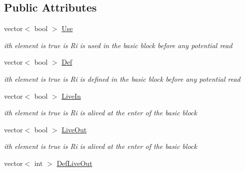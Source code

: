 \subsection*{Public Attributes}
\begin{DoxyCompactItemize}
\item 
\mbox{\label{class_basic__block_ab7802e6562cdb846d793a5a834b4678f}} 
vector$<$ bool $>$ \mbox{\hyperlink{class_basic__block_ab7802e6562cdb846d793a5a834b4678f}{Use}}
\begin{DoxyCompactList}\small\item\em ith element is true is Ri is used in the basic block before any potential read \end{DoxyCompactList}\item 
\mbox{\label{class_basic__block_a061288c8556fe1e29c75cc1864d67700}} 
vector$<$ bool $>$ \mbox{\hyperlink{class_basic__block_a061288c8556fe1e29c75cc1864d67700}{Def}}
\begin{DoxyCompactList}\small\item\em ith element is true is Ri is defined in the basic block before any potential read \end{DoxyCompactList}\item 
\mbox{\label{class_basic__block_ac772aedee0db949ff13844ee8a809e62}} 
vector$<$ bool $>$ \mbox{\hyperlink{class_basic__block_ac772aedee0db949ff13844ee8a809e62}{Live\+In}}
\begin{DoxyCompactList}\small\item\em ith element is true is Ri is alived at the enter of the basic block \end{DoxyCompactList}\item 
\mbox{\label{class_basic__block_a054946200a56d8c248f5a2ad7f1e1790}} 
vector$<$ bool $>$ \mbox{\hyperlink{class_basic__block_a054946200a56d8c248f5a2ad7f1e1790}{Live\+Out}}
\begin{DoxyCompactList}\small\item\em ith element is true is Ri is alived at the enter of the basic block \end{DoxyCompactList}\item 
\mbox{\label{class_basic__block_ae55324175eed352b99bdf3b366cdb168}} 
vector$<$ int $>$ \mbox{\hyperlink{class_basic__block_ae55324175eed352b99bdf3b366cdb168}{Def\+Live\+Out}}

\end{DoxyCompactItemize}

